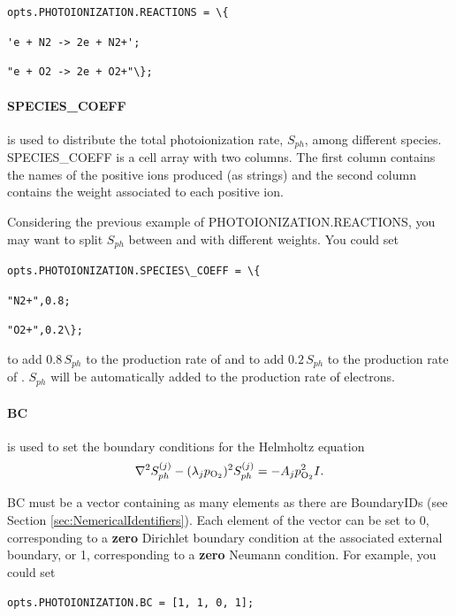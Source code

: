 \documentclass[12pt,a4paper]{article}
\newcommand{\matlabs}[1]{{\lstinline[style=MatlabStyle]!#1!}}
\begin{document}
	\matlabs{opts.PHOTOIONIZATION.REACTIONS = \{}
	
	\hspace{40pt} \matlabs{'e + N2 -> 2e + N2+';} 
	
	\hspace{40pt} \matlabs{"e + O2 -> 2e + O2+"\};}
	
	
	\paragraph{SPECIES\_COEFF} is used to distribute the total photoionization rate, $S_{ph}$, among different species.
	SPECIES\_COEFF is a cell array with two columns. The first column contains the names of the positive ions produced (as strings) and the second column contains the weight associated to each positive ion.
	
	Considering the previous example of PHOTOIONIZATION.REACTIONS, you may want to split $S_{ph}$ between  and  with different weights.
	You could set
	
	\matlabs{opts.PHOTOIONIZATION.SPECIES\_COEFF = \{}
	
	\hspace{40pt} \matlabs{"N2+",0.8;}
	
	\hspace{40pt} \matlabs{"O2+",0.2\};}
	
	\noindent to add $0.8 \, S_{ph}$ to the production rate of  and to add $0.2 \, S_{ph}$ to the production rate of . $S_{ph}$ will be automatically added to the production rate of electrons.
	
	\paragraph{BC} is used to set the boundary conditions for the Helmholtz equation
	\begin{equation*}
		\nabla^2 S_{ph}^{(j)} - (\lambda_j p_{\ce{O2}})^2 S_{ph}^{(j)} = -A_j p_{\ce{O2}}^2 I .
	\end{equation*}
	
	BC must be a vector containing as many elements as there are BoundaryIDs (see Section \ref{sec:NemericalIdentifiers}). Each element of the vector can be set to 0, corresponding to a \textbf{zero} Dirichlet boundary condition at the associated external boundary, or 1, corresponding to a \textbf{zero} Neumann condition. 
	For example, you could set
	
	\matlabs{opts.PHOTOIONIZATION.BC = [1, 1, 0, 1];}
	
\end{document}
